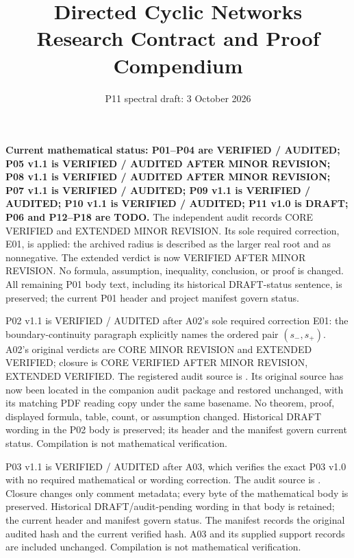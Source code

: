 \documentclass[11pt]{article}
\title{Directed Cyclic Networks\\Research Contract and Proof Compendium}
\author{}
\date{P11 spectral draft: 3 October 2026}
\begin{document}
\maketitle
\begingroup\small
\noindent\textbf{Current mathematical status: P01--P04 are VERIFIED / AUDITED;
P05 v1.1 is VERIFIED / AUDITED AFTER MINOR REVISION; P08 v1.1 is VERIFIED / AUDITED AFTER MINOR REVISION;
P07 v1.1 is VERIFIED / AUDITED; P09 v1.1 is VERIFIED / AUDITED; P10 v1.1 is VERIFIED / AUDITED; P11 v1.0 is DRAFT; P06 and P12--P18 are TODO.} The independent audit
 records CORE VERIFIED
and EXTENDED MINOR REVISION. Its sole required correction, E01, is applied:
the archived radius is described as the larger real root and as nonnegative.
The extended verdict is now VERIFIED AFTER MINOR REVISION. No formula,
assumption, inequality, conclusion, or proof is changed. All remaining P01
body text, including its historical DRAFT-status sentence, is preserved;
the current P01 header and project manifest govern status.

\smallskip\noindent P02 v1.1 is VERIFIED / AUDITED after A02's sole required
correction E01: the boundary-continuity paragraph explicitly names the
ordered pair $(s_-,s_+)$. A02's original verdicts are CORE MINOR REVISION
and EXTENDED VERIFIED; closure is CORE VERIFIED AFTER MINOR REVISION,
EXTENDED VERIFIED. The registered audit source is
. Its original
source has now been located in the companion audit package and restored
unchanged, with its matching PDF reading copy under the same basename.
No theorem, proof, displayed formula, table, count, or assumption changed.
Historical DRAFT wording in the P02 body is preserved; its header and the
manifest govern current status. Compilation is not mathematical verification.

\smallskip\noindent P03 v1.1 is VERIFIED / AUDITED after A03, which verifies
the exact P03 v1.0 with no required mathematical or wording correction.
The audit source is .
Closure changes only
comment metadata; every byte of the mathematical body is preserved.
Historical DRAFT/audit-pending wording in that body is retained; the current
header and manifest govern status. The manifest records the original audited
hash and the current verified hash. A03 and its supplied support records are
included unchanged. Compilation is not mathematical verification.
\end{document}
